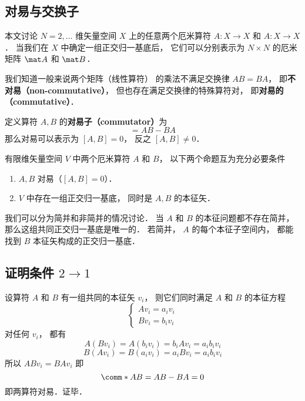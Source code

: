


\subsection{对易与交换子}
本文讨论 $N = 2, \dots$ 维矢量空间 $X$ 上的任意两个厄米算符 $A: X \to X$ 和 $A: X \to X$． 当我们在 $X$ 中确定一组正交归一基底后， 它们可以分别表示为 $N \times N$ 的厄米矩阵 $\mat A$ 和 $\mat B$．

我们知道一般来说两个矩阵（线性算符）%
的乘法不满足交换律 $AB = BA$， 即\textbf{不对易（non-commutative）}， 但也存在满足交换律的特殊算符对， 即\textbf{对易的（commutative）}．

定义算符 $A,B$ 的\textbf{对易子（commutator）}为
\begin{equation}
[A, B] = AB - BA
\end{equation}
那么对易可以表示为 $[A,B] = 0$， 反之 $[A,B]\ne 0$．

\begin{theorem}{}
有限维矢量空间 $V$ 中两个厄米算符 $A$ 和 $B$， 以下两个命题互为充分必要条件
\begin{enumerate}
\item $A,B$ 对易（$[A,B] = 0$）．
\item $V$ 中存在一组正交归一基底， 同时是 $A, B$ 的本征矢．
\end{enumerate}
\end{theorem}


我们可以分为简并和非简并的情况讨论． 当 $A$ 和 $B$ 的本征问题都不存在简并， 那么这组共同正交归一基底是唯一的． 若简并， $A$ 的每个本征子空间内， 都能找到 $B$ 本征矢构成的正交归一基底．

\subsection{证明条件 $2 \to 1$}
设算符 $A$ 和 $B$ 有一组共同的本征矢 $v_i$，  则它们同时满足 $A$ 和 $B$ 的本征方程
\begin{equation}
\begin{cases}
A v_i = a_i v_i\\
B v_i = b_i v_i
\end{cases}
\end{equation}
对任何 $v_i$，  都有
\begin{equation}
A (B v_i) = A (b_i v_i) = b_iA v_i = a_i b_i v_i
\end{equation}
\begin{equation}
B (A v_i) = B (a_i v_i) = a_i B v_i = a_i b_i v_i
\end{equation}
所以 $AB v_i = BA v_i$ 即
\begin{equation}
\comm*{A}{B} = AB - BA = 0
\end{equation}
即两算符对易．证毕．

